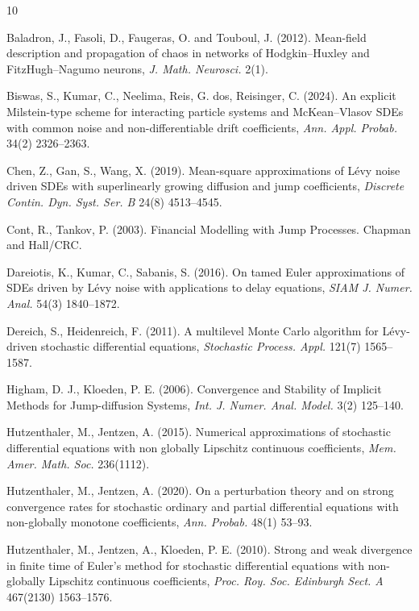 \documentclass[reqno,  oneside, 12pt]{amsart}
\begin{document}
	\begin{thebibliography}{10}
		
		Baladron, J., Fasoli, D., Faugeras, O. and Touboul, J. (2012). Mean-field description and propagation of chaos in networks of Hodgkin--Huxley and FitzHugh--Nagumo neurons, \emph{J. Math. Neurosci.} 2(1).
		
		Biswas, S., Kumar, C., Neelima, Reis, G. dos, Reisinger, C. (2024). An explicit Milstein-type scheme for interacting particle systems and McKean--Vlasov SDEs with common noise and non-differentiable drift coefficients, \emph{Ann. Appl. Probab.} 34(2) 2326--2363.
		
		Chen, Z., Gan, S., Wang, X. (2019). Mean-square approximations of L\'evy noise driven SDEs with superlinearly growing diffusion and jump coefficients, \emph{Discrete Contin. Dyn. Syst. Ser. B} 24(8) 4513--4545.
		
		Cont, R., Tankov, P. (2003). Financial Modelling with Jump Processes. Chapman and Hall/CRC.
		
		Dareiotis, K., Kumar, C., Sabanis, S. (2016). On tamed Euler approximations of SDEs driven by L\'evy noise with applications to delay equations, \emph{SIAM J. Numer. Anal.} 54(3) 1840--1872.
		
		Dereich, S., Heidenreich, F. (2011). A multilevel Monte Carlo algorithm for L\'evy-driven stochastic differential equations, \emph{Stochastic Process. Appl.} 121(7) 1565--1587.
		
		Higham, D. J., Kloeden, P. E. (2006). Convergence and Stability of Implicit Methods for Jump-diffusion Systems, \emph{Int. J. Numer. Anal. Model.} 3(2) 125--140.
		
		Hutzenthaler, M., Jentzen, A. (2015). Numerical approximations of stochastic differential equations with non globally Lipschitz continuous coefficients, \emph{Mem. Amer. Math. Soc.} 236(1112).
		
		Hutzenthaler, M., Jentzen, A. (2020). On a perturbation theory and on strong convergence rates for stochastic ordinary and partial differential equations with non-globally monotone coefficients, \emph{Ann. Probab.} 48(1) 53--93.
		
		Hutzenthaler, M., Jentzen, A., Kloeden, P. E. (2010). Strong and weak divergence in finite time of Euler’s method for stochastic differential equations with non-globally Lipschitz continuous coefficients, \emph{Proc. Roy. Soc. Edinburgh Sect. A} 467(2130) 1563--1576.
		

\end{thebibliography}
\end{document}

